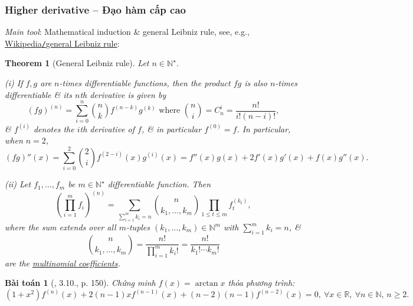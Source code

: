 \documentclass{article}
\newtheorem{baitoan}{Bài toán}
\newtheorem{theorem}{Theorem}
\begin{document}
\subsubsection{Higher derivative -- Đạo hàm cấp cao}
{\it Main tool}: Mathematical induction \& general Leibniz rule, see, e.g., \href{https://en.wikipedia.org/wiki/General_Leibniz_rule}{Wikipedia{\tt/}general Leibniz rule}:

\begin{theorem}[General Leibniz rule]
	Let $n\in\mathbb{N}^\star$.
	\item(i) If $f,g$ are $n$-times differentiable functions, then the product $fg$ is also $n$-times differentiable \& its $n$th derivative is given by
	\begin{equation*}
		(fg)^{(n)} = \sum_{i=0}^n \binom{n}{k}f^{(n-k)}g^{(k)}\mbox{ where }\binom{n}{i} = C_n^i = \frac{n!}{i!(n - i)!},
	\end{equation*}
	\& $f^{(i)}$ denotes the $i$th derivative of $f$, \& in particular $f^{(0)} = f$. In particular, when $n = 2$,
	\begin{equation*}
		(fg)''(x) = \sum_{i=0}^2 \binom{2}{i}f^{(2-i)}(x)g^{(i)}(x) = f''(x)g(x) + 2f'(x)g'(x) + f(x)g''(x).
	\end{equation*}
	\item(ii) Let $f_1,\ldots,f_m$ be $m\in\mathbb{N}^\star$ differentiable function. Then
	\begin{equation*}
		\left(\prod_{i=1}^m f_i\right)^{(n)} = \sum_{\sum_{i=1}^m k_i = n} \binom{n}{k_1,\ldots,k_m}\prod_{1\le t\le m} f_t^{(k_t)},
	\end{equation*}
	where the sum extends over all $m$-tuples $(k_1,\ldots,k_m)\in\mathbb{N}^m$ with $\sum_{i=1}^m k_i = n$, \&
	\begin{equation*}
		\binom{n}{k_1,\ldots,k_m} = \frac{n!}{\prod_{i=1}^m k_i!} = \frac{n!}{k_1!\cdots k_m!}
	\end{equation*}
	are the \href{https://en.wikipedia.org/wiki/Multinomial_coefficient}{multinomial coefficients}.
\end{theorem}

\begin{baitoan}[\cite{Quoc_Long_Dat_Nam_VMC}, 3.10., p. 150]
	Chứng minh $f(x) = \arctan x$ thỏa phương trình:
	\begin{equation*}
		(1 + x^2)f^{(n)}(x) + 2(n - 1)xf^{(n-1)}(x) + (n - 2)(n - 1)f^{(n-2)}(x) = 0,\ \forall x\in\mathbb{R},\ \forall n\in\mathbb{N},\,n\ge2.
	\end{equation*}
\end{baitoan}
\end{document}
